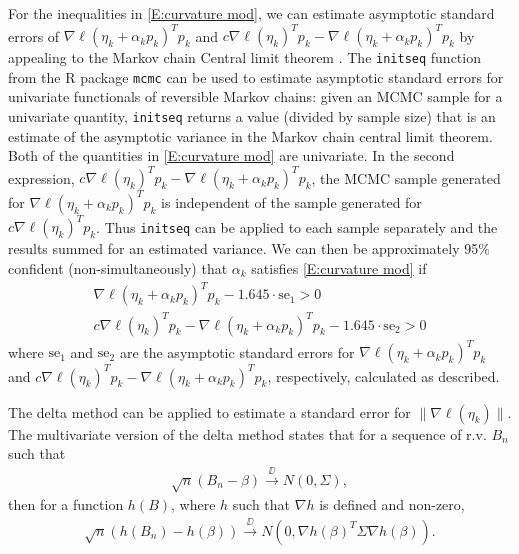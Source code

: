 For the inequalities in \eqref{E:curvature mod}, we can estimate asymptotic standard 
errors of $\nabla \ell( \eta_k + 
\alpha_k p_k)^T p_k$  and $c \nabla \ell(\eta_k)^T p_k - \nabla \ell( \eta_k + 
\alpha_k p_k)^T p_k$ by appealing to the 
Markov chain Central limit theorem \citep{Chan:1994,Jones:2004,Roberts:1997,Roberts:
2004}.
The \texttt{initseq} function from the R package \texttt{mcmc} \citep{mcmc:R} can be 
used to estimate asymptotic 
standard errors for univariate functionals of reversible Markov chains: given an MCMC 
sample for a univariate 
quantity, \texttt{initseq}
returns a value (divided by sample size) that is an estimate of the asymptotic 
variance in the Markov chain central 
limit theorem.  Both of the quantities in \eqref{E:curvature mod} are univariate.  In 
the second expression, $c \nabla \ell(\eta_k)^T 
p_k - \nabla \ell( \eta_k + \alpha_k p_k)^T p_k$, the MCMC sample generated for $
\nabla \ell( \eta_k + \alpha_k p_k)^T 
p_k$ is independent of the sample generated for $c \nabla \ell(\eta_k)^T p_k$.  Thus 
\texttt{initseq} can be applied 
to each sample separately and the results summed for an estimated variance.  
We can then be approximately 95\% confident (non-simultaneously) that $\alpha_k$ 
satisfies \eqref{E:curvature 
mod} if
\begin{align*}
	 \nabla \ell( \eta_k + \alpha_k p_k)^T p_k - 1.645 \cdot \text{se}_1 > 0 \\
	 c \nabla \ell(\eta_k)^T p_k - \nabla \ell( \eta_k + \alpha_k p_k)^T p_k - 1.645 
\cdot \text{se}_2 > 0 
\end{align*}
where $\text{se}_1$ and $\text{se}_2$ are the asymptotic standard errors for $\nabla 
\ell( \eta_k + \alpha_k p_k)^T p_k
$  and $c \nabla \ell(\eta_k)^T p_k - \nabla \ell( \eta_k + \alpha_k p_k)^T p_k$, 
respectively, calculated as described.

The delta method can be applied to estimate a standard error for $\lVert \nabla \ell
( \eta_k ) \rVert$. 
The multivariate version of the delta method states that for a sequence of r.v. $B_n$ 
such that
\begin{align*}
	\sqrt{n} ( B_n - \beta) \stackrel{\DD}{\longrightarrow} N( 0, \Sigma ),
\end{align*}
then for a function $h(B)$, where $h$ such that $\nabla h$ is defined and non-zero,
\begin{align*}
	\sqrt{n} \left ( h(B_n) - h(\beta) \right ) \stackrel{\DD}{\longrightarrow} N 
\left ( 0, \nabla h( \beta)^T \Sigma\nabla h( \beta)  \right ).
\end{align*}

